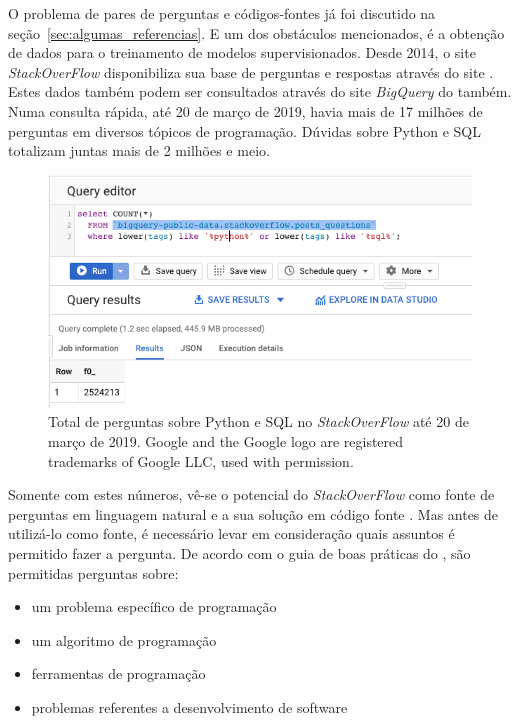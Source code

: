 O problema de pares de perguntas e códigos-fontes já foi discutido na seção~\ref{sec:algumas_referencias}. E um dos obstáculos mencionados, é a obtenção de dados para o treinamento de modelos supervisionados. Desde 2014, o site \textit{StackOverFlow} disponibiliza sua base de perguntas e respostas através do site \cite{sof-2019}. Estes dados também podem ser consultados através do site \textit{BigQuery} do \cite{bigquery-2019} também. Numa consulta rápida, até 20 de março de 2019, havia mais de 17 milhões de perguntas em diversos tópicos de programação. Dúvidas sobre Python e SQL totalizam juntas mais de 2 milhões e meio.

\begin{figure}[h]
\includegraphics[width=12cm]{figuras/cap-problema/post-questions-python-sql-total.png}
\caption{Total de perguntas sobre Python e SQL no \textit{StackOverFlow} até 20 de março de 2019. Google and the Google logo are registered trademarks of Google LLC, used with permission.}
\label{fig:bigquery-total-questions-python-sql-stackoverflow}
\end{figure}

Somente com estes números, vê-se o potencial do \textit{StackOverFlow} como fonte de perguntas em linguagem natural e a sua solução em código fonte \cite{yao-2018}. Mas antes de utilizá-lo como fonte, é necessário levar em consideração quais assuntos é permitido fazer a pergunta. De acordo com o guia de boas práticas do \cite{stackoverflow-questions-topics-2019}, são permitidas perguntas sobre:

\begin{itemize}
    \item um problema específico de programação
    \item um algoritmo de programação
    \item ferramentas de programação
    \item problemas referentes a desenvolvimento de software
\end{itemize}

